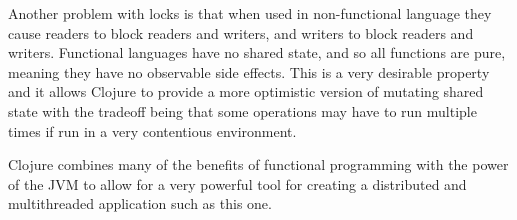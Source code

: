 Another problem with locks is that when used in non-functional language they cause 
readers to block readers and writers, and writers to block readers and writers. Functional 
languages have no shared state, and so all functions are pure, meaning they have no observable
side effects. This is a very desirable property and it allows Clojure to provide a more optimistic version
of mutating shared state with the tradeoff being that some operations may have to run multiple times if run 
in a very contentious environment. 


Clojure combines many of the benefits of functional programming with the power of the JVM to allow for a very powerful tool for creating a distributed and multithreaded application such as this one.  





